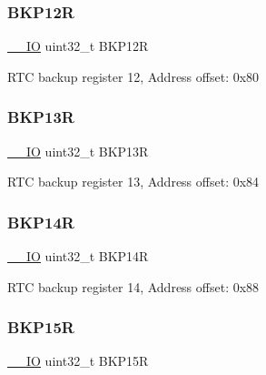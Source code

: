 \subsubsection{\texorpdfstring{B\+K\+P12R}{BKP12R}}
{\footnotesize\ttfamily \mbox{\hyperlink{core__sc300_8h_aec43007d9998a0a0e01faede4133d6be}{\+\_\+\+\_\+\+IO}} uint32\+\_\+t B\+K\+P12R}

R\+TC backup register 12, Address offset\+: 0x80 \mbox{\label{struct_r_t_c___type_def_a6ed4c3a0d4588a75078e9f8e376b4d06}} 
\subsubsection{\texorpdfstring{B\+K\+P13R}{BKP13R}}
{\footnotesize\ttfamily \mbox{\hyperlink{core__sc300_8h_aec43007d9998a0a0e01faede4133d6be}{\+\_\+\+\_\+\+IO}} uint32\+\_\+t B\+K\+P13R}

R\+TC backup register 13, Address offset\+: 0x84 \mbox{\label{struct_r_t_c___type_def_ac60f13e6619724747e61cfbff55b9fab}} 
\subsubsection{\texorpdfstring{B\+K\+P14R}{BKP14R}}
{\footnotesize\ttfamily \mbox{\hyperlink{core__sc300_8h_aec43007d9998a0a0e01faede4133d6be}{\+\_\+\+\_\+\+IO}} uint32\+\_\+t B\+K\+P14R}

R\+TC backup register 14, Address offset\+: 0x88 \mbox{\label{struct_r_t_c___type_def_afafaddc3a983eb71332b7526d82191ad}} 
\subsubsection{\texorpdfstring{B\+K\+P15R}{BKP15R}}
{\footnotesize\ttfamily \mbox{\hyperlink{core__sc300_8h_aec43007d9998a0a0e01faede4133d6be}{\+\_\+\+\_\+\+IO}} uint32\+\_\+t B\+K\+P15R}

